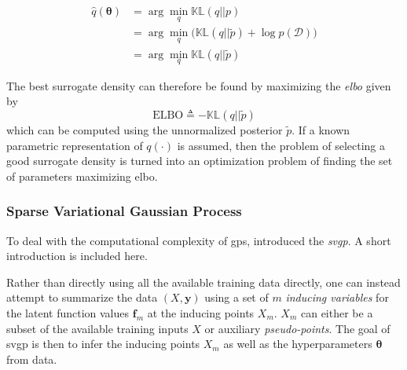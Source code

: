 \begin{align}
    \hat{q}(\boldsymbol{\theta}) &= \arg \min_q \mathbb{KL}(q || p)\\ &= \arg \min_q \big(\mathbb{KL}(q || \tilde{p}) + \log p(\mathcal{D})\big) \\&= \arg \min_q \mathbb{KL} (q || \tilde{p})
\end{align}

The best surrogate density can therefore be found by maximizing the \textit{\acrfull{elbo}} given by 
\begin{equation}
    \text{ELBO} \triangleq -\mathbb{KL}(q || \tilde{p})
\end{equation} which can be computed using the unnormalized posterior $\tilde{p}$. If a known parametric representation of $q(\cdot)$ is assumed, then the problem of selecting a good surrogate density is turned into an optimization problem of finding the set of parameters maximizing \acrshort{elbo}. 

\subsubsection{Sparse Variational Gaussian Process}
To deal with the computational complexity of \acrshort{gp}s, \cite{Titsias2008VariationalMS} introduced the \textit{\acrfull{svgp}}. A short introduction is included here. 

Rather than directly using all the available training data directly, one can instead attempt to summarize the data $(X, \boldsymbol{y})$ using a set of $m$ \textit{inducing variables} for the latent function values $\boldsymbol{f}_m$ at the inducing points $X_m$. $X_m$ can either be a subset of the available training inputs $X$ or auxiliary \textit{pseudo-points}. The goal of \acrshort{svgp} is then to infer the inducing points $X_m$ as well as the hyperparameters $\boldsymbol{\theta}$ from data.



\subsubsection{}
